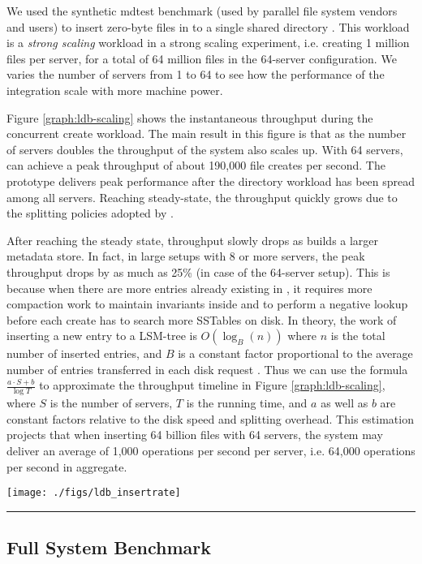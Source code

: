 We used the synthetic mdtest benchmark \cite{mdtest}
(used by parallel file system vendors and users) to insert
zero-byte files in to a single shared directory \cite{ceph:weil06, GIGA11}.
This workload is a \textit{strong scaling}
workload in a strong scaling experiment, i.e.
creating 1 million files per server, for a total of 64 million files in the
64-server configuration. We varies the number of servers from 1 to 64
to see how the performance of the integration scale with more machine power.

Figure \ref{graph:ldb-scaling} shows the instantaneous throughput
during the concurrent create workload.
The main result in this figure is that as the number of servers doubles the
throughput of the system also scales up. With 64 servers, \giga can achieve a
peak throughput of about 190,000 file creates per second.
The prototype delivers peak performance after the directory workload
has been spread among all servers.
Reaching steady-state, the throughput quickly grows
due to the splitting policies adopted by \giga.

After reaching the steady state, throughput slowly drops
as \tfs builds a larger metadata store.
In fact, in large setups with 8 or more servers,
the peak throughput drops by as much as 25\% (in case of the 64-server setup).
This is because when there are more entries already existing in \tfs,
it requires more compaction work to maintain invariants inside \ldb
and to perform a negative lookup before each create
has to search more SSTables on disk.
In theory, the work of inserting a new entry to a LSM-tree is $O(\log_{B}(n))$
where $n$ is the total number of inserted entries, and $B$ is a constant factor
proportional to the average number of entries transferred in each disk request
\cite{Bender2007}.
Thus we can use the formula $\frac{a\cdot S+b}{\log{T}}$ to
approximate the throughput timeline in Figure \ref{graph:ldb-scaling},
where $S$ is the number of servers, $T$ is the running time,
and $a$ as well as $b$ are constant factors
relative to the disk speed and splitting overhead.
This estimation projects that when inserting 64 billion files with 64 servers,
the system may deliver an average of 1,000 operations per second per server,
i.e. 64,000 operations per second in aggregate.

\begin{figure*}[t]
\centerline{\texttt{[image: ./figs/ldb\_insertrate]}}
\vspace{10pt}
\caption{\normalsize
\textit{Our middleware metadata service prototype shows promising scalability
up to 64 servers.
Note that at the end of the experiment,
the throughput drops to zero
because clients stop creating files as they finish 1 million files per client.
And the solid lines in each configuration are Bezier
curves to smooth the variability.}
}
\vspace{10pt}
\hrule
\label{graph:ldb-scaling}
\end{figure*}

\subsection{Full System Benchmark}
\label{sec:fullsystem}


